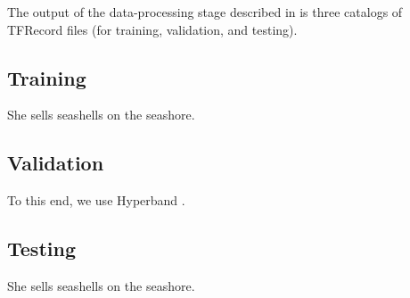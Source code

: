 
The output of the data-processing stage described in  is three
catalogs of TFRecord files (for training, validation, and testing).

\subsection{Training}
She sells seashells on the seashore.

\subsection{Validation}
To this end, we use Hyperband \cite{li2016}.

\subsection{Testing}
She sells seashells on the seashore.
